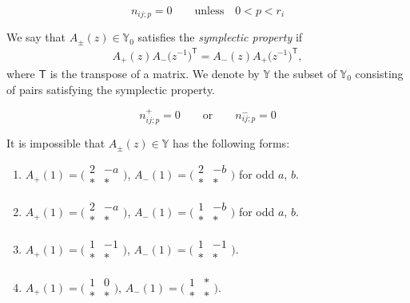 \documentclass[10pt,a4paper]{amsart}
\begin{document}
\begin{equation}\label{eq:Y1}
n_{ij;p} = 0\qquad \text{unless} \quad 0 < p < r_i
\end{equation}

\begin{Definition}
 We say that $A_\pm (z) \in \mathbb{Y}_0$ satisfies the \emph{symplectic property} if
 \begin{align}\label{eq:symplectic property}
 A_+ (z) A_-\bigl(z^{-1}\bigr)^{\mathsf{T}} = A_- (z) A_+ \bigl(z^{-1}\bigr)^{\mathsf{T}},
 \end{align}
 where $\mathsf{T}$ is the transpose of a matrix.
 We denote by $\mathbb{Y}$ the subset of $\mathbb{Y}_0$ consisting of pairs satisfying the symplectic property.
\end{Definition}

\begin{equation}\label{eq:Y2}
 n_{ij;p}^{+} = 0 \qquad \text{or} \qquad n_{ij;p}^{-}=0
\end{equation}

\begin{Lemma}\label{lemma:ban list}
 It is impossible that $A_\pm(z) \in \mathbb{Y}$ has the following forms:
 \begin{enumerate}\itemsep=0pt
 \item[$(1)$]
 $A_+(1) =
 \bigl(\begin{smallmatrix}
 2 & -a \\
 * & *
 \end{smallmatrix}\bigr)$,
 $A_-(1) =
 \bigl(\begin{smallmatrix}
 2 & -b \\
 * & *
 \end{smallmatrix}\bigr)$ for odd $a$, $b$.
 \item[$(2)$]
 $A_+(1) =
 \bigl(\begin{smallmatrix}
 2 & -a \\
 * & *
 \end{smallmatrix}\bigr)$,
 $A_-(1) =
 \bigl(\begin{smallmatrix}
 1 & -b \\
 * & *
 \end{smallmatrix}\bigr)$ for odd $a$, $b$.
 \item[$(3)$]
 $A_+(1) =
 \bigl(\begin{smallmatrix}
 1 & -1 \\
 * & *
 \end{smallmatrix}\bigr)$,
 $A_-(1) =
 \bigl(\begin{smallmatrix}
 1 & -1 \\
 * & *
 \end{smallmatrix}\bigr)$.
 \item[$(4)$]
 $A_+(1) =
 \bigl(\begin{smallmatrix}
 1 & 0 \\
 * & *
 \end{smallmatrix}\bigr)$,
 $A_-(1) =
 \bigl(\begin{smallmatrix}
 1 & * \\
 * & *
 \end{smallmatrix}\bigr)$.
 \end{enumerate}
\end{Lemma}
\end{document}
